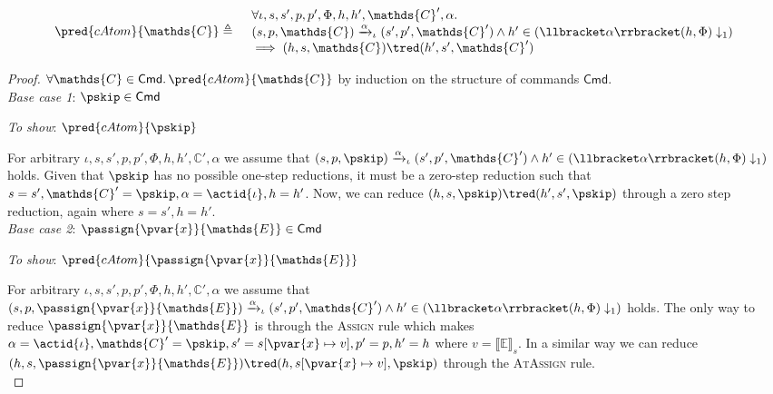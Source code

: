 \begin{lem}
	\label{lem:catom}
	\[
	\begin{array}{r l}
		\pred{cAtom}{\mathds{C}} \triangleq&
		\begin{array}{l}
		\forall \iota, s, s', p, p', \Phi, h, h', \mathds{C}', \alpha \ldotp \\
		(s, p, \mathds{C}) \xrightarrow{\alpha}_\iota (s', p', \mathds{C}') \land h' \in \left( \llbracket \alpha \rrbracket(h, \Phi) \downarrow_1 \right) \\
		\implies
		(h, s, \mathds{C}) \tred (h', s', \mathds{C}')
		\end{array}
	\end{array}
	\]
	
	{\parindent0pt
	\begin{proof}
	$\forall \mathds{C} \in \mathsf{Cmd} \ldotp \pred{cAtom}{\mathds{C}}$ by induction on the structure of commands $\mathsf{Cmd}$. \\
	
	\textit{Base case 1}: $\pskip \in \mathsf{Cmd}$
	
	\textit{To show}: $\pred{cAtom}{\pskip}$
	
	For arbitrary $\iota, s, s', p, p', \Phi, h, h', \mathds{C}', \alpha$ we assume that $(s, p, \pskip) \xrightarrow{\alpha}_\iota (s', p', \mathds{C}') \land h' \in \left( \llbracket \alpha \rrbracket(h, \Phi) \downarrow_1 \right)$ holds. Given that $\pskip$ has no possible one-step reductions, it must be a zero-step reduction such that $s = s', \mathds{C}' = \pskip, \alpha = \actid{\iota}, h = h'$. Now, we can reduce $(h, s, \pskip) \tred (h', s', \pskip)$ through a zero step reduction, again where $s = s', h = h'$. \\
	
	\textit{Base case 2}: $\passign{\pvar{x}}{\mathds{E}} \in \mathsf{Cmd}$
	
	\textit{To show}: $\pred{cAtom}{\passign{\pvar{x}}{\mathds{E}}}$
	
	For arbitrary $\iota, s, s', p, p', \Phi, h, h', \mathds{C}', \alpha$ we assume that $(s, p, \passign{\pvar{x}}{\mathds{E}}) \xrightarrow{\alpha}_\iota (s', p', \mathds{C}') \land h' \in \left( \llbracket \alpha \rrbracket(h, \Phi) \downarrow_1 \right)$ holds. The only way to reduce $\passign{\pvar{x}}{\mathds{E}}$ is through the \textsc{Assign} rule which makes $\alpha = \actid{\iota}, \mathds{C}' = \pskip, s' = s[\pvar{x} \mapsto v], p' = p, h' = h$ where $v = \llbracket \mathds{E} \rrbracket_s$. In a similar way we can reduce $(h, s, \passign{\pvar{x}}{\mathds{E}}) \tred (h, s[\pvar{x} \mapsto v], \pskip)$ through the \textsc{AtAssign} rule. \\
	

\end{proof}}
\end{lem}
